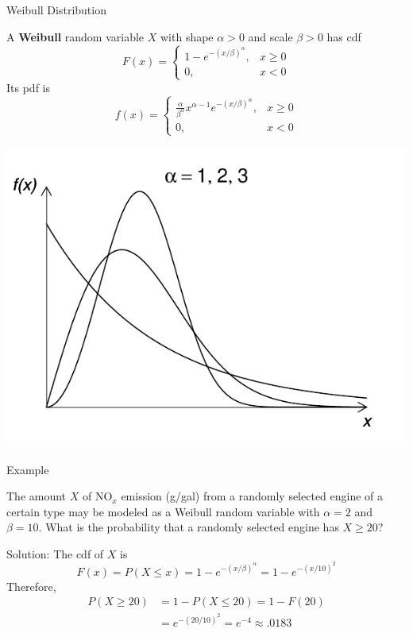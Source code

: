 \documentclass{beamer}
\renewcommand{\emph}{\textbf}
\begin{document}
\begin{frame}{Weibull Distribution}
\begin{block}{}
A \emph{Weibull} random variable $X$ with shape $\alpha>0$ and scale $\beta>0$ has cdf
$$F(x)=\begin{cases}1-e^{-(x/\beta)^\alpha}, & x\geq 0 \\ 0, & x<0\end{cases}$$
Its pdf is
$$f(x)=\begin{cases}\frac{\alpha}{\beta^\alpha}x^{\alpha-1}e^{-(x/\beta)^\alpha}, & x\geq 0 \\ 0, & x<0\end{cases}$$
\end{block}
\begin{center}
\includegraphics[scale=.5]{ch4_pdf_weibull.pdf}
\end{center}
\end{frame}

\begin{frame}{Example}
\begin{block}{}
The amount $X$ of $\mathrm{NO}_x$ emission (g/gal) from a randomly
selected engine of a certain type may be modeled as a Weibull
random variable with $\alpha=2$ and $\beta=10$. What is the probability that a randomly selected engine has $X \geq 20$?
\end{block}
\pause Solution: The cdf of $X$ is
$$F(x) = P(X \leq x) = 1-e^{-(x/\beta)^\alpha} = 1-e^{-(x/10)^2}$$
\pause Therefore,
\begin{align*}
P(X \geq 20) &= 1-P(X \leq 20) = 1-F(20)\\
&= e^{-(20/10)^2} = e^{-4} \approx .0183
\end{align*}
\end{frame}
\end{document}
